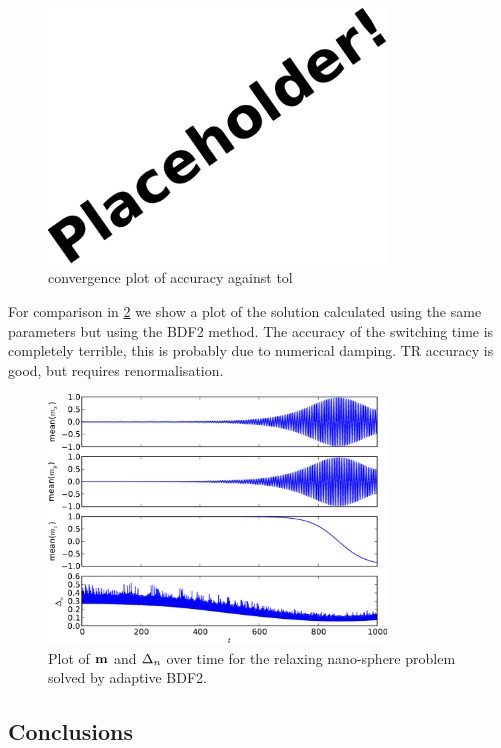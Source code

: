 \begin{figure}
  \centering
  \includegraphics[width=0.8\textwidth]{images/placeholder}
  \caption{convergence plot of accuracy against tol}
  \label{fig:imr-llg-ode-accury-tol}
\end{figure}


For comparison in \cref{fig:bdf2-llg-ode} we show a plot of the solution calculated using the same parameters but using the BDF2 method.
The accuracy of the switching time is completely terrible, this is probably due to numerical damping.
TR accuracy is good, but requires renormalisation.

\begin{figure}
  \centering
  \includegraphics[width=0.8\textwidth]{plots/aimr-sphere-relax/bdf2-meanmxsvs-meanmysvs-meanmzsvs-dtsvstimes.pdf}
  \caption{Plot of $\mathbf{m}$ and $\Delta_{n}$ over time for the relaxing nano-sphere problem solved by adaptive BDF2.}
  \label{fig:bdf2-llg-ode}
\end{figure}

\subsection{Conclusions}

